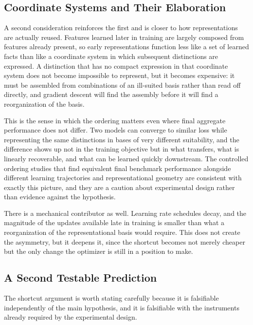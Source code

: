 \documentclass[11pt]{article}
\begin{document}
\subsection{Coordinate Systems and Their Elaboration}

A second consideration reinforces the first and is closer to how representations are actually reused. Features learned later in training are largely composed from features already present, so early representations function less like a set of learned facts than like a coordinate system in which subsequent distinctions are expressed. A distinction that has no compact expression in that coordinate system does not become impossible to represent, but it becomes expensive: it must be assembled from combinations of an ill-suited basis rather than read off directly, and gradient descent will find the assembly before it will find a reorganization of the basis.

This is the sense in which the ordering matters even where final aggregate performance does not differ. Two models can converge to similar loss while representing the same distinctions in bases of very different suitability, and the difference shows up not in the training objective but in what transfers, what is linearly recoverable, and what can be learned quickly downstream. The controlled ordering studies that find equivalent final benchmark performance alongside different learning trajectories and representational geometry are consistent with exactly this picture, and they are a caution about experimental design rather than evidence against the hypothesis.

There is a mechanical contributor as well. Learning rate schedules decay, and the magnitude of the updates available late in training is smaller than what a reorganization of the representational basis would require. This does not create the asymmetry, but it deepens it, since the shortcut becomes not merely cheaper but the only change the optimizer is still in a position to make.

\subsection{A Second Testable Prediction}
\label{sec:shortcut-prediction}

The shortcut argument is worth stating carefully because it is falsifiable independently of the main hypothesis, and it is falsifiable with the instruments already required by the experimental design.
\end{document}
